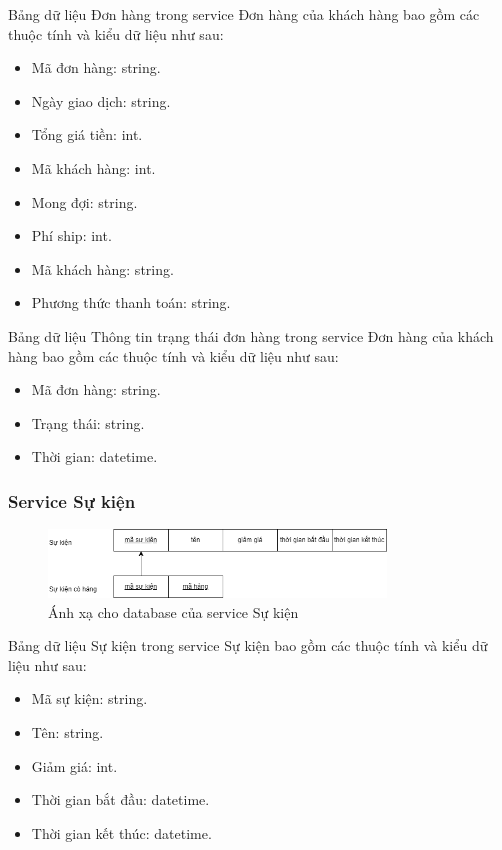 Bảng dữ liệu Đơn hàng trong service Đơn hàng của khách hàng bao gồm các thuộc tính và kiểu dữ liệu như sau:
\begin{itemize}
	\item Mã đơn hàng: string.
	\item Ngày giao dịch: string.
	\item Tổng giá tiền: int.
	\item Mã khách hàng: int.
	\item Mong đợi: string.
	\item Phí ship: int.
	\item Mã khách hàng: string.
	\item Phương thức thanh toán: string.
\end{itemize}

Bảng dữ liệu Thông tin trạng thái đơn hàng trong service Đơn hàng của khách hàng bao gồm các thuộc tính và kiểu dữ liệu như sau:
\begin{itemize}
	\item Mã đơn hàng: string.
	\item Trạng thái: string.
	\item Thời gian: datetime.
\end{itemize}

\subsubsection{Service Sự kiện}
\begin{figure}[!htp]
	\begin{center}
		\includegraphics[width=0.8\textwidth]{img/database/mapping/mapping-event.png}
		\newline
		\caption{Ánh xạ cho database của service Sự kiện}
	\end{center}
\end{figure}

Bảng dữ liệu Sự kiện trong service Sự kiện bao gồm các thuộc tính và kiểu dữ liệu như sau:
\begin{itemize}
	\item Mã sự kiện: string.
	\item Tên: string.
	\item Giảm giá: int.
	\item Thời gian bắt đầu: datetime.
	\item Thời gian kết thúc: datetime.
\end{itemize}


